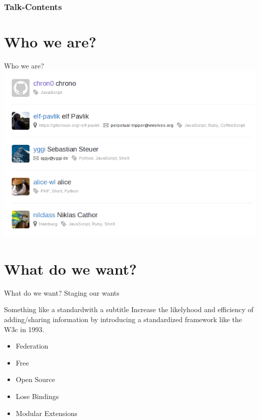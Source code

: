 \documentclass{beamer}
\begin{document}
\addtocounter{framenumber}{-1}


{
\begin{frame}[plain]
\frametitle{\vspace{-2.12ex}Talk-Contents}
 \tableofcontents
\end{frame}
}

\addtocounter{framenumber}{-1}
\setcounter{page}{1}

%
%

\section{Who we are?}

\begin{frame}{Who we are?}
 \vspace{1em}
 \includegraphics[scale=0.4]{images/dspace-hackers}
\end{frame}

\section{What do we want?}

\begin{frame}{What do we want?}
 Staging our wants
\end{frame}

\begin{frame}{Something like a standard}{with a subtitle}
 Increase the likelyhood and efficiency of adding/sharing information by introducing
 a standardized framework like the W3c in 1993.
 \begin{itemize}
  \item Federation
  \item Free
  \item Open Source
  \item Lose Bindings
  \item Modular Extensions
 \end{itemize}
\end{frame}
\end{document}
